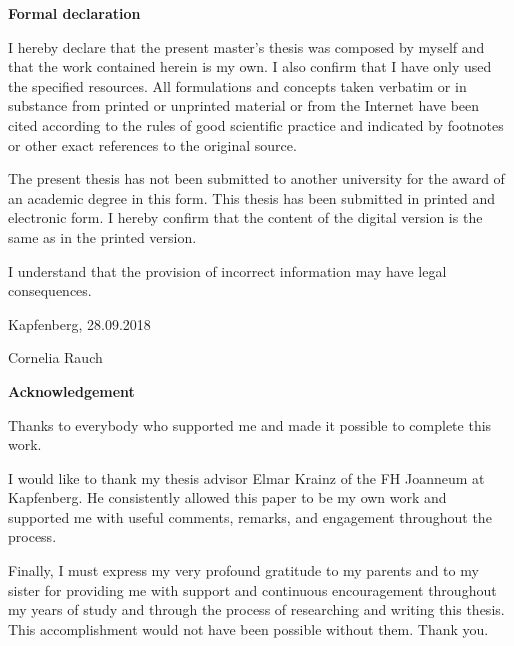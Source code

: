 \chapterend

\begin{titlepage}


\begin{center}\large\bf
Formal declaration
\end{center}


I hereby declare that the present master's thesis was composed by myself and that the work contained herein is my own. I also confirm that I have only used the specified resources. All formulations and concepts taken verbatim or in substance from printed or unprinted material or from the Internet have been cited according to the rules of good scientific practice and indicated by footnotes or other exact references to the original source. 

The present thesis has not been submitted to another university for the award of an academic degree in this form. This thesis has been submitted in printed and electronic form. I hereby confirm that the content of the digital version is the same as in the printed version.

I understand that the provision of incorrect information may have legal consequences.

\vspace{1,5cm}
Kapfenberg, 28.09.2018

\flushright
\vspace{15mm}
Cornelia Rauch

\end{titlepage}



\chapterend

\begin{titlepage}

\begin{center}\large\bf
Acknowledgement
\end{center}
Thanks to everybody who supported me and made it possible to complete this work.

I would like to thank my thesis advisor Elmar Krainz of the FH Joanneum at Kapfenberg. He consistently allowed this paper to be my own work and supported me with useful comments, remarks, and engagement throughout the process. 

Finally, I must express my very profound gratitude to my parents and to my sister for providing me with support and continuous encouragement throughout my years of study and through the process of researching and writing this thesis. This accomplishment would not have been possible without them. Thank you.

\end{titlepage}



\chapterend
